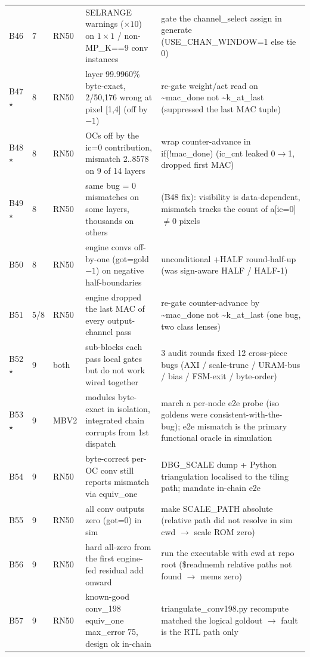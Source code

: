 \documentclass[acmtog,authorversion]{acmart}
\begin{document}
\begin{longtable}{@{}l l l p{} p{}@{}}
B46 & 7 & RN50 & SELRANGE warnings ($\times10$) on $1\times1$ / non-MP\_K==9 conv instances & gate the channel\_select assign in generate (USE\_CHAN\_WINDOW=1 else tie 0) \\
B47 $\star$ & 8 & RN50 & layer 99.9960\% byte-exact, 2/50,176 wrong at pixel [1,4] (off by $-1$) & re-gate weight/act read on \textasciitilde{}mac\_done not \textasciitilde{}k\_at\_last (suppressed the last MAC tuple) \\
B48 $\star$ & 8 & RN50 & OCs off by the ic=0 contribution, mismatch 2..8578 on 9 of 14 layers & wrap counter-advance in if(!mac\_done) (ic\_cnt leaked 0$\rightarrow$1, dropped first MAC) \\
B49 $\star$ & 8 & RN50 & same bug = 0 mismatches on some layers, thousands on others & (B48 fix): visibility is data-dependent, mismatch tracks the count of a[ic=0]$\neq$0 pixels \\
B50 & 8 & RN50 & engine convs off-by-one (got=gold$-1$) on negative half-boundaries & unconditional +HALF round-half-up (was sign-aware HALF / HALF-1) \\
B51 & 5/8 & RN50 & engine dropped the last MAC of every output-channel pass & re-gate counter-advance by \textasciitilde{}mac\_done not \textasciitilde{}k\_at\_last (one bug, two class lenses) \\
B52 $\star$ & 9 & both & sub-blocks each pass local gates but do not work wired together & 3 audit rounds fixed 12 cross-piece bugs (AXI / scale-trunc / URAM-bus / bias / FSM-exit / byte-order) \\
B53 $\star$ & 9 & MBV2 & modules byte-exact in isolation, integrated chain corrupts from 1st dispatch & march a per-node e2e probe (iso goldens were consistent-with-the-bug); e2e mismatch is the primary functional oracle in simulation \\
B54 & 9 & RN50 & byte-correct per-OC conv still reports mismatch via equiv\_one & DBG\_SCALE dump + Python triangulation localised to the tiling path; mandate in-chain e2e \\
B55 & 9 & RN50 & all conv outputs zero (got=0) in sim & make SCALE\_PATH absolute (relative path did not resolve in sim cwd $\rightarrow$ scale ROM zero) \\
B56 & 9 & RN50 & hard all-zero from the first engine-fed residual add onward & run the executable with cwd at repo root (\$readmemh relative paths not found $\rightarrow$ mems zero) \\
B57 & 9 & RN50 & known-good conv\_198 equiv\_one max\_error 75, design ok in-chain & triangulate\_conv198.py recompute matched the logical goldout $\rightarrow$ fault is the RTL path only \\

\end{longtable}
\end{document}
